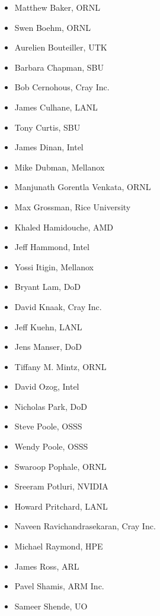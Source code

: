 \begin{multicols}{2}
\begin{itemize}
\setlength\itemsep{0.1em}
\item Matthew Baker, \ac{ORNL}
\item Swen Boehm, \ac{ORNL}
\item Aurelien Bouteiller, \ac{UTK}
\item Barbara Chapman, \ac{SBU}
\item Bob Cernohous, Cray Inc.
\item James Culhane, \ac{LANL}
\item Tony Curtis, \ac{SBU}
\item James Dinan, Intel
\item Mike Dubman, Mellanox
\item Manjunath Gorentla Venkata, \ac{ORNL}
\item Max Grossman, Rice University
\item Khaled Hamidouche, \ac{AMD}
\item Jeff Hammond, Intel
\item Yossi Itigin, Mellanox
\item Bryant Lam, \ac{DoD}
\item David Knaak, Cray Inc.
\item Jeff Kuehn, \ac{LANL}
\item Jens Manser, \ac{DoD}
\item Tiffany M. Mintz, \ac{ORNL}
\item David Ozog, Intel
\item Nicholas Park, \ac{DoD}
\item Steve Poole, \ac{OSSS}
\item Wendy Poole, \ac{OSSS}
\item Swaroop Pophale, \ac{ORNL}
\item Sreeram Potluri, NVIDIA
\item Howard Pritchard, \ac{LANL}
\item Naveen Ravichandrasekaran, Cray Inc.
\item Michael Raymond, \ac{HPE}
\item James Ross, \ac{ARL}
\item Pavel Shamis, ARM Inc.
\item Sameer Shende, \ac{UO}
\end{itemize}
\end{multicols}

